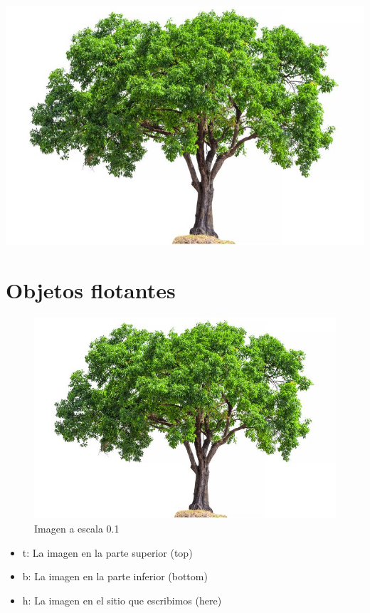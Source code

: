 \documentclass[12pt]{article}
\begin{document}
\begin{center}
\includegraphics[scale=.25]{figuras/tree.jpg}
\end{center}

\section{Objetos flotantes}


\begin{figure}[!hb]
\centering
\includegraphics[scale=0.1]{figuras/tree.jpg}
\caption{Imagen a escala 0.1}
\label{figura1}
\end{figure}

\begin{itemize}
\item t: La imagen en la parte superior (top)
\item b: La imagen en la parte inferior (bottom)
\item h: La imagen en el sitio que escribimos (here) 
\end{itemize}
\end{document}
